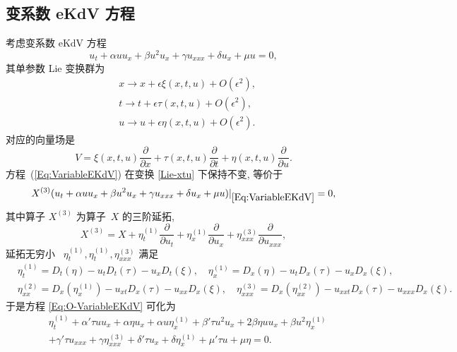 \subsection{变系数 eKdV 方程}
考虑变系数 eKdV 方程
\begin{equation}\label{Eq:VariableEKdV}
u_t+\alpha uu_x+\beta u^2u_x+\gamma u_{xxx}+\delta u_x+\mu u=0,
\end{equation}
其单参数 Lie 变换群为
\begin{equation}\label{Lie-xtu}
\begin{aligned}
&x\rightarrow x+\epsilon \xi(x,t,u)+O(\epsilon^2),\\
&t\rightarrow t+\epsilon \tau(x,t,u)+O(\epsilon^2),\\
&u\rightarrow u+\epsilon \eta(x,t,u)+O(\epsilon^2).
\end{aligned}
\end{equation}
对应的向量场是
\begin{equation}\label{Lie-vector}
V=\xi(x,t,u)\frac{\partial}{\partial x}+\tau(x,t,u)\frac{\partial}{\partial t}+\eta(x,t,u)\frac{\partial}{\partial u}.
\end{equation}
方程~(\ref{Eq:VariableEKdV})  在变换 \eqref{Lie-xtu} 下保持不变, 等价于
\begin{equation}\label{Eq:O-VariableEKdV}
X^{(3)}(u_t+\alpha uu_x+\beta u^2u_x+\gamma u_{xxx}+\delta u_x+\mu u)|_{\eqref{Eq:VariableEKdV}}=0,
\end{equation}
其中算子 $X^{(3)}$ 为算子~$X$ 的三阶延拓,
\begin{equation}
X^{(3)}=X+\eta_t^{(1)}\frac{\partial}{\partial u_t}+\eta_x^{(1)}\frac{\partial}{\partial u_x}+\eta_{xxx}^{(3)}\frac{\partial}{\partial u_{xxx}},
\end{equation}
延拓无穷小~ $\eta_t^{(1)}, \eta_t^{(1)}, \eta_{xxx}^{(3)}$ 满足
\begin{align*}
&\eta_t^{(1)}=D_t(\eta)-u_tD_t(\tau)-u_xD_t(\xi),\quad \eta_x^{(1)}=D_x(\eta)-u_tD_x(\tau)-u_xD_x(\xi),\\
&\eta_{xx}^{(2)}=D_x(\eta_x^{(1)})-u_{xt}D_x(\tau)-u_{xx}D_x(\xi),\quad \eta_{xxx}^{(3)}=D_x(\eta_{xx}^{(2)})-u_{xxt}D_x(\tau)-u_{xxx}D_x(\xi).
\end{align*}
于是方程 \eqref{Eq:O-VariableEKdV} 可化为
\begin{equation}
\begin{aligned}\label{Lie-eKdV}
&\eta_t^{(1)}+\alpha'\tau uu_x+\alpha\eta u_x+\alpha u\eta_x^{(1)}+\beta'\tau u^2u_x+2\beta\eta uu_x+\beta u^2\eta_x^{(1)}\\
&+\gamma'\tau u_{xxx}+\gamma \eta_{xxx}^{(3)}+\delta'\tau u_x+\delta \eta_x^{(1)}+\mu'\tau u+\mu\eta=0.
\end{aligned}
\end{equation}
